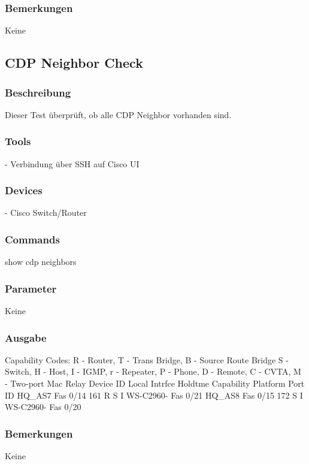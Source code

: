 \documentclass[a4,12pt]{scrartcl}
\begin{document}
\subsubsection{Bemerkungen}
Keine



\subsection{CDP Neighbor Check}
\subsubsection{Beschreibung}
Dieser Test überprüft, ob alle CDP Neighbor vorhanden sind.
\subsubsection{Tools}
- Verbindung über SSH auf Cisco UI
\subsubsection{Devices}
- Cisco Switch/Router
\subsubsection{Commands}
show cdp neighbors
\subsubsection{Parameter}
Keine
\subsubsection{Ausgabe}
Capability Codes: R - Router, T - Trans Bridge, B - Source Route Bridge\newline
                  S - Switch, H - Host, I - IGMP, r - Repeater, P - Phone,\newline
                  D - Remote, C - CVTA, M - Two-port Mac Relay\newline
Device ID        Local Intrfce     Holdtme    Capability  Platform  Port ID\newline
HQ_AS7           Fas 0/14          161             R S I  WS-C2960- Fas 0/21\newline
HQ_AS8           Fas 0/15          172              S I   WS-C2960- Fas 0/20\newline
\subsubsection{Bemerkungen}
Keine
\end{document}
